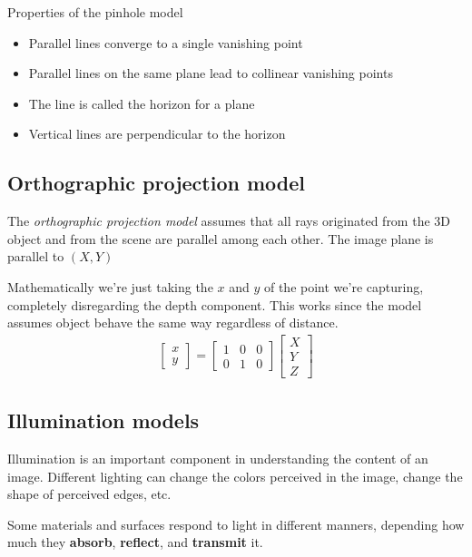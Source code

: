 \documentclass{article}
\begin{document}
Properties of the pinhole model
\begin{itemize}
    \item Parallel lines converge to a single vanishing point
    \item Parallel lines on the same plane lead to collinear vanishing points
    \item The line is called the horizon for a plane
    \item Vertical lines are perpendicular to the horizon
\end{itemize}

\subsection{Orthographic projection model}
The \textit{orthographic projection model} assumes that all rays originated from the 3D object and from the scene are parallel among each other.
The image plane is parallel to $(X, Y)$

Mathematically we're just taking the $x$ and $y$ of the point we're capturing, completely disregarding the depth component. This works since the model assumes object behave the same way regardless of distance.
\begin{align*}
    \left[
    \begin{array}{c}
        x\\ y
    \end{array}
\right] 
    = 
    \left[
    \begin{array}{ccc}
        1 &0&0\\0&1&0
    \end{array}
\right] 
    \left[
    \begin{array}{c}
        X\\ Y\\ Z
    \end{array}
\right] 
\end{align*}

\subsection{Illumination models}
Illumination is an important component in understanding the content of an image. Different lighting can change the colors perceived in the image, change the shape of perceived edges, etc.

Some materials and surfaces respond to light in different manners, depending how much they \textbf{absorb}, \textbf{reflect}, and \textbf{transmit} it.
\end{document}

